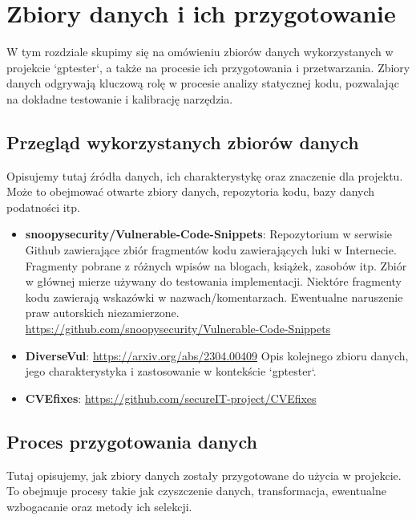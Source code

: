 \chapter{Zbiory danych i ich przygotowanie}
\label{ch:zbiory_danych}

W tym rozdziale skupimy się na omówieniu zbiorów danych wykorzystanych w projekcie `gptester`, a także na procesie ich przygotowania i przetwarzania. Zbiory danych odgrywają kluczową rolę w procesie analizy statycznej kodu, pozwalając na dokładne testowanie i kalibrację narzędzia.

\section{Przegląd wykorzystanych zbiorów danych}
\label{sec:przeglad_zbiorow}

Opisujemy tutaj źródła danych, ich charakterystykę oraz znaczenie dla projektu. Może to obejmować otwarte zbiory danych, repozytoria kodu, bazy danych podatności itp.

\begin{itemize}
    \item \textbf{snoopysecurity/Vulnerable-Code-Snippets}: Repozytorium w serwisie Github zawierające zbiór fragmentów kodu zawierających luki w Internecie. Fragmenty pobrane z różnych wpisów na blogach, książek, zasobów itp. 
    Zbiór w głównej mierze używany do testowania implementacji. Niektóre fragmenty kodu zawierają wskazówki w nazwach/komentarzach. Ewentualne naruszenie praw autorskich niezamierzone.\\ \url{https://github.com/snoopysecurity/Vulnerable-Code-Snippets}

    \item \textbf{DiverseVul}: \url{https://arxiv.org/abs/2304.00409} Opis kolejnego zbioru danych, jego charakterystyka i zastosowanie w kontekście `gptester`.
    \item \textbf{CVEfixes}: \url{https://github.com/secureIT-project/CVEfixes}
\end{itemize}

\section{Proces przygotowania danych}
\label{sec:proces_przygotowania_danych}

Tutaj opisujemy, jak zbiory danych zostały przygotowane do użycia w projekcie. To obejmuje procesy takie jak czyszczenie danych, transformacja, ewentualne wzbogacanie oraz metody ich selekcji.


